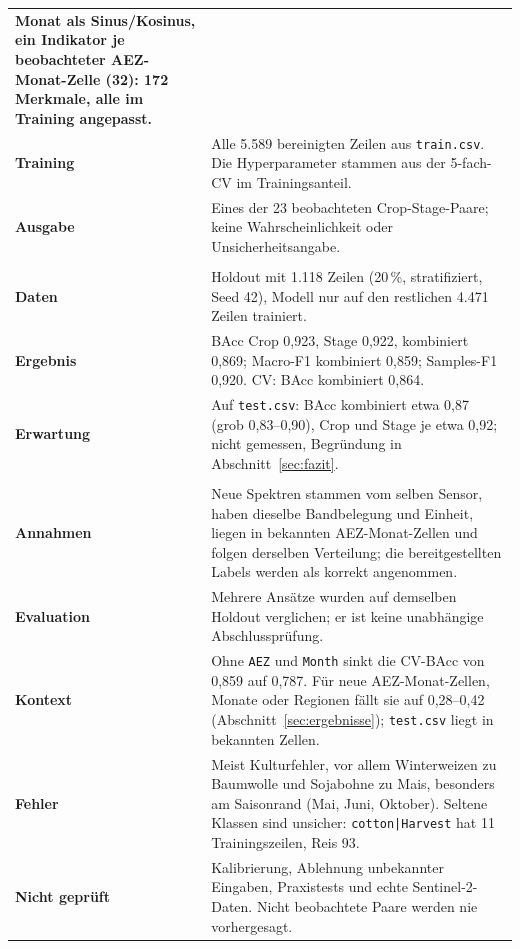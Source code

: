 \documentclass[11pt,a4paper,titlepage]{article}
\begin{document}
\begin{tabularx}{\linewidth}{@{}>{\bfseries}p{3.1cm}X@{}}
		Monat als Sinus/Kosinus, ein Indikator je beobachteter AEZ-Monat-Zelle (32):
		172 Merkmale, alle im Training angepasst. \\
	Training & Alle 5.589 bereinigten Zeilen aus \texttt{train.csv}. Die Hyperparameter
		stammen aus der 5-fach-CV im Trainingsanteil. \\
	Ausgabe & Eines der 23 beobachteten Crop-Stage-Paare; keine
		Wahrscheinlichkeit oder Unsicherheitsangabe. \\
	\midrule
	\multicolumn{2}{@{}l}{\textbf{Evaluation}} \\
	\midrule
	Daten & Holdout mit 1.118 Zeilen (20\,\%, stratifiziert, Seed 42), Modell nur auf den
		restlichen 4.471 Zeilen trainiert. \\
	Ergebnis & BAcc Crop 0,923, Stage 0,922, kombiniert 0,869; Macro-F1 kombiniert 0,859;
		Samples-F1 0,920. CV: BAcc kombiniert 0,864. \\
	Erwartung & Auf \texttt{test.csv}: BAcc kombiniert etwa 0,87 (grob 0,83--0,90), Crop und
		Stage je etwa 0,92; nicht gemessen, Begr\"undung in Abschnitt~\ref{sec:fazit}. \\
	\midrule
	\multicolumn{2}{@{}l}{\textbf{Annahmen, Grenzen und Risiken}} \\
	\midrule
	Annahmen & Neue Spektren stammen vom selben Sensor, haben dieselbe Bandbelegung und
		Einheit, liegen in bekannten AEZ-Monat-Zellen und folgen derselben Verteilung; die
		bereitgestellten Labels werden als korrekt angenommen. \\
	Evaluation & Mehrere Ans\"atze wurden auf demselben Holdout verglichen; er ist keine
		unabh\"angige Abschlusspr\"ufung. \\
	Kontext & Ohne \texttt{AEZ} und \texttt{Month} sinkt die CV-BAcc von 0,859 auf 0,787.
		F\"ur neue AEZ-Monat-Zellen, Monate oder Regionen f\"allt sie auf 0,28--0,42
		(Abschnitt~\ref{sec:ergebnisse}); \texttt{test.csv} liegt in bekannten Zellen. \\
	Fehler & Meist Kulturfehler, vor allem Winterweizen zu Baumwolle und Sojabohne zu Mais,
		besonders am Saisonrand (Mai, Juni, Oktober). Seltene Klassen sind unsicher:
		\texttt{cotton|Harvest} hat 11 Trainingszeilen, Reis 93. \\
	Nicht gepr\"uft & Kalibrierung, Ablehnung unbekannter Eingaben, Praxistests und echte
		Sentinel-2-Daten. Nicht beobachtete Paare werden nie vorhergesagt. \\
	\bottomrule
\end{tabularx}
\endgroup
\end{document}

